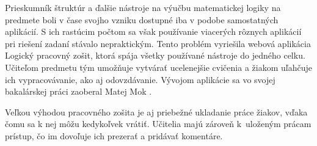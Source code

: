 
Prieskumník štruktúr a ďalšie nástroje na výučbu matematickej logiky na predmete boli v čase svojho vzniku dostupné iba v podobe samostatných aplikácií. S ich rastúcim počtom sa však používanie viacerých rôznych aplikácií pri riešení zadaní stávalo nepraktickým. Tento problém vyriešila webová aplikácia Logický pracovný zošit, ktorá spája všetky používané nástroje do jedného celku. Učiteľom predmetu tým umožňuje vytvárať ucelenejšie cvičenia a žiakom uľahčuje ich vypracovávanie, ako aj odovzdávanie. Vývojom aplikácie sa vo svojej bakalárskej práci zaoberal Matej Mok \cite{mok2022}. 

Veľkou výhodou pracovného zošita je aj priebežné ukladanie práce žiakov, vďaka čomu sa k nej môžu kedykoľvek vrátiť. Učitelia majú zároveň k~uloženým prácam prístup, čo im dovoľuje ich prezerať a pridávať komentáre.


